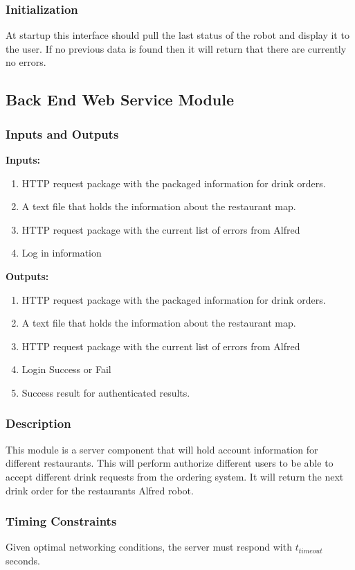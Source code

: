 \documentclass [10pt]{article}
\begin{document}
\subsubsection{Initialization}
At startup this interface should pull the last status of the robot and display it to the user. If no previous data is found then it will return that there are currently no errors.

\subsection{Back End Web Service Module}

\subsubsection{Inputs and Outputs}

\textbf{Inputs: } 
\begin{enumerate}
	\item HTTP request package with the packaged information for drink orders.
	\item A text file that holds the information about the restaurant map.
	\item HTTP request package with the current list of errors from Alfred
	\item Log in information
\end{enumerate}

\textbf{Outputs: } 
\begin{enumerate}
	\item HTTP request package with the packaged information for drink orders.
	\item A text file that holds the information about the restaurant map.
	\item HTTP request package with the current list of errors from Alfred
	\item Login Success or Fail
	\item Success result for authenticated results. 
\end{enumerate}
\subsubsection{Description}
This module is a server component that will hold account information for different restaurants. This will perform authorize different users to be able to accept different drink requests from the ordering system. It will return the next drink order for the restaurants Alfred robot.
\subsubsection{Timing Constraints}
Given optimal networking conditions, the server must respond with  $ t_{timeout} $ seconds.
\end{document}
